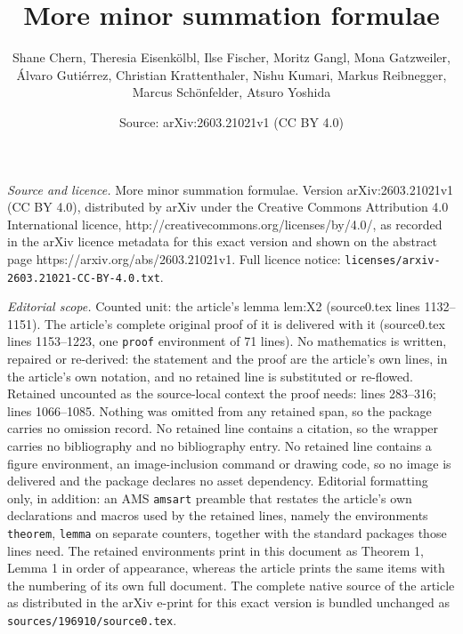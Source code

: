 \documentclass[10pt,a4paper]{amsart}
\title{More minor summation formulae}
\author{Shane Chern, Theresia Eisenk\"olbl, Ilse Fischer, Moritz Gangl, Mona Gatzweiler, \'Alvaro Guti\'errez, Christian Krattenthaler, Nishu Kumari, Markus Reibnegger, Marcus Sch\"onfelder, Atsuro Yoshida}
\date{Source: arXiv:2603.21021v1 (CC BY 4.0)}
\begin{document}
\maketitle

\noindent\emph{Source and licence.} More minor summation formulae. Version arXiv:2603.21021v1 (CC BY 4.0), distributed by arXiv under the Creative Commons Attribution 4.0 International licence, http://creativecommons.org/licenses/by/4.0/, as recorded in the arXiv licence metadata for this exact version and shown on the abstract page https://arxiv.org/abs/2603.21021v1. Full licence notice: \texttt{licenses/arxiv-2603.21021-CC-BY-4.0.txt}.\par\smallskip

\noindent\textit{Editorial scope.} Counted unit: the article's lemma lem:X2 (source0.tex lines 1132--1151). The article's complete original proof of it is delivered with it (source0.tex lines 1153--1223, one \texttt{proof} environment of 71 lines). No mathematics is written, repaired or re-derived: the statement and the proof are the article's own lines, in the article's own notation, and no retained line is substituted or re-flowed.  Retained uncounted as the source-local context the proof needs: lines 283--316; lines 1066--1085.  Nothing was omitted from any retained span, so the package carries no omission record.  No retained line contains a citation, so the wrapper carries no bibliography and no bibliography entry.  No retained line contains a figure environment, an image-inclusion command or drawing code, so no image is delivered and the package declares no asset dependency.  Editorial formatting only, in addition: an AMS \texttt{amsart} preamble that restates the article's own declarations and macros used by the retained lines, namely the environments \texttt{theorem}, \texttt{lemma} on separate counters, together with the standard packages those lines need.  The retained environments print in this document as Theorem 1, Lemma 1 in order of appearance, whereas the article prints the same items with the numbering of its own full document.  The complete native source of the article as distributed in the arXiv e-print for this exact version is bundled unchanged as \texttt{sources/196910/source0.tex}.
\end{document}
